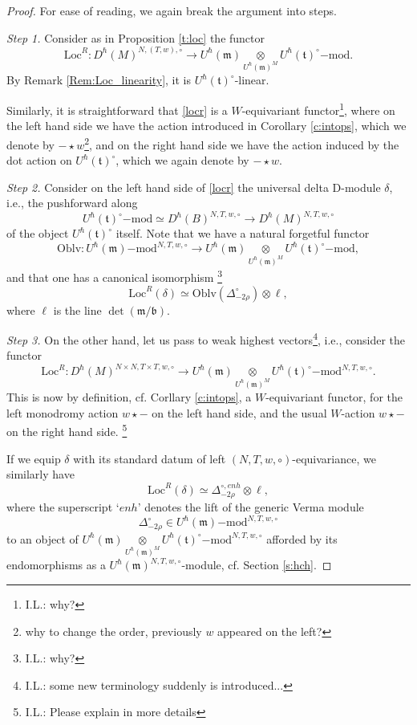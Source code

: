 \documentclass{amsart}
\theoremstyle{definition}
\newcommand{\fm}{\mathfrak{m}}
\newcommand{\fb}{\mathfrak{b}}
\newcommand{\lmod}{\on{-mod}}
\newcommand{\ft}{\mathfrak{t}}
\newcommand{\on}{\mathrm}
\numberwithin{equation}{section}
\begin{document}
\begin{proof} For ease of reading, we again break the argument into steps. 

{\it Step 1.} Consider as in Proposition \ref{t:loc} the functor
\begin{equation} \label{locr}\on{Loc}^R: D^\hbar(M)^{N, (T, w), \circ} \rightarrow U^\hbar(\fm) \underset{U^\hbar(\fm)^M} \otimes U^\hbar(\ft)^\circ\lmod.\end{equation}
By Remark \ref{Rem:Loc_linearity}, it is $U^\hbar(\ft)^\circ$-linear. 

Similarly, it is straightforward that \eqref{locr} is a $W$-equivariant functor\footnote{I.L.: why?}, where on the left hand side we have the action introduced in Corollary \ref{c:intops}, which we denote by $- \star w$\footnote{why to change the order, previously $w$ appeared on the left?}, and on the right hand side we have the action induced by the dot action on $U^\hbar(\ft)^\circ$, which we again denote by $ - \star w$.  


{\it Step 2.} Consider on the left hand side of \eqref{locr} the universal delta D-module $\delta$, i.e., the pushforward along $$U^\hbar(\ft)^\circ\lmod \simeq D^\hbar(B)^{N, T, w, \circ} \rightarrow D^\hbar(M)^{N,T, w, \circ}$$
of the object $U^\hbar(\ft)^\circ$ itself. Note that we have a natural forgetful functor
$$\on{Oblv}: U^\hbar(\fm)\lmod^{N, T, w, \circ} \rightarrow  U^\hbar(\fm) \underset{U^\hbar(\fm)^M} \otimes U^\hbar(\ft)^\circ\lmod,$$and that one has a canonical isomorphism \footnote{I.L.: why?}
$$\on{Loc}^R(\delta) \simeq \on{Oblv}(\Delta^\circ_{-2\rho}) \otimes \ell,$$
where $\ell$ is the line $\det(\fm/\fb)$.

{\it Step 3.} On the other hand, let us pass to weak highest vectors\footnote{I.L.: some new terminology suddenly is introduced...}, i.e., consider the functor
\begin{equation} \label{locrup}\on{Loc}^R:  D^\hbar(M)^{N \times N, T \times T, w, \circ} \rightarrow U^\hbar(\fm) \underset{U^\hbar(\fm)^M} \otimes U^\hbar(\ft)^\circ\lmod^{N, T, w, \circ}.\end{equation}This is now by definition, cf. Corllary \ref{c:intops}, a $W$-equivariant functor, for the left monodromy action $w \star -$ on the left hand side, and the usual $W$-action $w \star -$ on the right hand side. \footnote{I.L.: Please explain in more details}

If we equip $\delta$ with its standard datum of left $(N, T, w, \circ)$-equivariance, we similarly have 
$$\on{Loc}^R(\delta) \simeq \Delta^{\circ, enh}_{-2\rho} \otimes \ell,$$
where the superscript `$enh$' denotes the lift of the generic Verma module $$\Delta^\circ_{-2\rho} \in U^\hbar(\fm)\lmod^{N, T, w, \circ}$$
to an object of $U^\hbar(\fm) \underset{U^\hbar(\fm)^M} \otimes U^\hbar(\ft)^\circ\lmod^{N, T, w, \circ}$ afforded by its endomorphisms as a $U^\hbar(\fm)^{N,T, w, \circ}$-module, cf. Section \ref{s:hch}. 




\end{proof}
\end{document}
